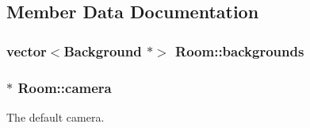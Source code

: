 \subsection{Member Data Documentation}
\hypertarget{class_room_a2fc816969da445fc7f0bbb3ff7a5ca9f}{
\subsubsection[{backgrounds}]{\setlength{\rightskip}{0pt plus 5cm}vector$<${\bf Background} $\ast$$>$ Room\-::backgrounds\hspace{0.3cm}{\ttfamily [protected]}}}\label{class_room_a2fc816969da445fc7f0bbb3ff7a5ca9f}
\hypertarget{class_room_ae5dbd0283ba91cb66a53fd6f5229c4a3}{
\subsubsection[{camera}]{$\ast$ Room\-::camera}}\label{class_room_ae5dbd0283ba91cb66a53fd6f5229c4a3}


The default camera. 

